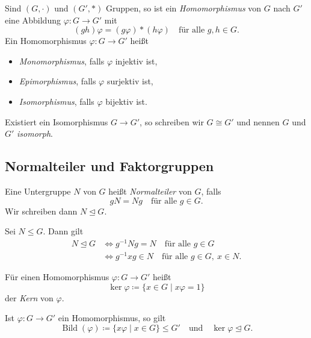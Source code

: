 \documentclass[11pt]{article}
\begin{document}
\begin{definition}[Homomorphismus]\Theorem
  Sind $(G, \cdot)$ und $(G', \ast)$ Gruppen, so ist ein \emph{Homomorphismus} von $G$ nach $G'$ eine Abbildung $\varphi\colon G \to G'$ mit
  \[ (gh)\varphi = (g\varphi) \ast (h\varphi) \quad \text{für alle } g, h \in G. \]
  Ein Homomorphismus $\varphi\colon G \to G'$ heißt
  \begin{itemize}
    \item \emph{Monomorphismus}, falls $\varphi$ injektiv ist,
    \item \emph{Epimorphismus}, falls $\varphi$ surjektiv ist,
    \item \emph{Isomorphismus}, falls $\varphi$ bijektiv ist.
  \end{itemize}
  Existiert ein Isomorphismus $G \to G'$, so schreiben wir $G \cong G'$ und nennen $G$ und $G'$ \emph{isomorph}.
\end{definition}

\subsection{Normalteiler und Faktorgruppen}

\begin{definition}[Normalteiler]\Theorem
  Eine Untergruppe $N$ von $G$ heißt \emph{Normalteiler} von $G$, falls
  \[ gN = Ng \quad \text{für alle } g \in G. \]
  Wir schreiben dann $N \trianglelefteq G$.
\end{definition}

\begin{lemma}[Robinson 1.3.15]\Theorem
  Sei $N \le G$. Dann gilt
  \begin{align*}
    N \trianglelefteq G
    &\iff g^{-1}Ng = N \quad \text{für alle } g \in G \\
    &\iff g^{-1}xg \in N \quad \text{für alle } g \in G,\ x \in N.
  \end{align*}
\end{lemma}


\begin{ergaenzung}
Für einen Homomorphismus $\varphi\colon G \to G'$ heißt
\[ \ker\varphi \coloneqq \{x \in G \mid x\varphi = 1\} \]
der \emph{Kern} von $\varphi$.
\end{ergaenzung}


\begin{lemma}
  Ist $\varphi\colon G \to G'$ ein Homomorphismus, so gilt
  \[ \operatorname{Bild}(\varphi) \coloneqq \{x\varphi \mid x \in G\} \le G' \quad \text{und} \quad \ker \varphi \trianglelefteq G. \]
\end{lemma}
\end{document}
